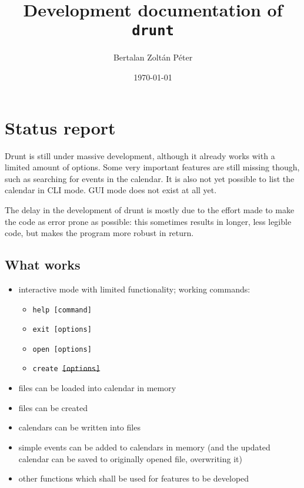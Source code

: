 \documentclass[a4paper]{article}
\title{Development documentation of \texttt{drunt}}
\author{Bertalan Zoltán Péter}
\date{\today}
\begin{document}
	\begin{titlepage}
		\maketitle
	\end{titlepage}

\section{Status report}

Drunt is still under massive development, although it already works with a limited amount of options. Some very important features are still missing though, such as searching for events in the calendar. It is also not yet possible to list the calendar in CLI mode. GUI mode does not exist at all yet.

The delay in the development of drunt is mostly due to the effort made to make the code as error prone as possible: this sometimes results in longer, less legible code, but makes the program more robust in return.

\subsection{What works}
\begin{itemize}
	\item interactive mode with limited functionality; working commands:
	\begin{itemize}
		\item \texttt{help [command]}
		\item \texttt{exit [options]}
		\item \texttt{open [options]}
		\item \texttt{create \sout{[options]}}
	\end{itemize}
	\item files can be loaded into calendar in memory
	\item files can be created
	\item calendars can be written into files
	\item simple events can be added to calendars in memory (and the updated calendar can be saved to originally opened file, overwriting it)
	\item other functions which shall be used for features to be developed
\end{itemize}
\end{document}

